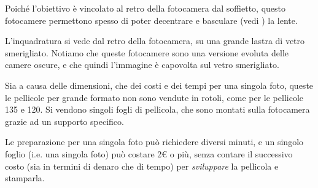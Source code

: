 Poiché l'obiettivo è vincolato al retro della fotocamera dal soffietto, questo fotocamere permettono spesso di poter decentrare e basculare (vedi ) la lente.

L'inquadratura si vede dal retro della fotocamera, su una grande lastra di vetro smerigliato. Notiamo che queste fotocamere sono una versione evoluta delle camere oscure, e che quindi l'immagine è capovolta sul vetro smerigliato.

Sia a causa delle dimensioni, che dei costi e dei tempi per una singola foto, queste le pellicole per grande formato non sono vendute in rotoli, come per le pellicole 135 e 120.
Si vendono singoli fogli di pellicola, che sono montati sulla fotocamera grazie ad un supporto specifico.

Le preparazione per una singola foto può richiedere diversi minuti, e un singolo foglio (i.e. una singola foto) può costare 2$\euro$ o più, senza contare il successivo costo (sia in termini di denaro che di tempo) per \textit{sviluppare} la pellicola e stamparla.